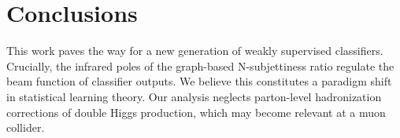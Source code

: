 \section{Conclusions}\label{sec:conclusions}

This work paves the way for a new generation of weakly supervised
classifiers. Crucially, the infrared poles of the graph-based
N-subjettiness ratio regulate the beam function of classifier outputs.
We believe this constitutes a paradigm shift in statistical learning
theory. Our analysis neglects parton-level hadronization corrections of
double Higgs production, which may become relevant at a muon collider.

